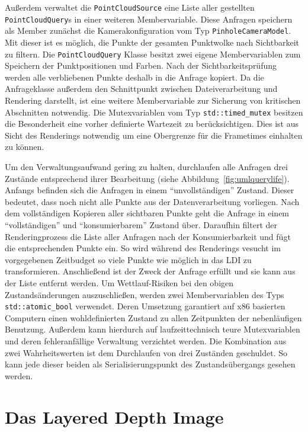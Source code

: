 \documentclass[hyperref, beleg, german]{cgvpub}
\begin{document}
Außerdem verwaltet die \texttt{PointCloudSource} eine Liste aller gestellten
\texttt{PointCloudQuery}s in einer weiteren Membervariable. Diese Anfragen
speichern als Member zunächst die Kamerakonfiguration vom Typ
\texttt{PinholeCameraModel}. Mit dieser ist es möglich, die Punkte der gesamten
Punktwolke nach Sichtbarkeit zu filtern. Die \texttt{PointCloudQuery} Klasse
besitzt zwei eigene Membervariablen zum Speichern der Punktpositionen und
Farben. Nach der Sichtbarkeitsprüfung werden alle verbliebenen Punkte deshalb
in die Anfrage kopiert. Da die Anfrageklasse außerdem den Schnittpunkt zwischen
Dateiverarbeitung und Rendering darstellt, ist eine weitere Membervariable zur
Sicherung von kritischen Abschnitten notwendig. Die Mutexvariablen vom Typ
\texttt{std::timed\_mutex} besitzen die Besonderheit eine vorher definierte
Wartezeit zu berücksichtigen. Dies ist aus Sicht des Renderings notwendig um
eine Obergrenze für die Frametimes einhalten zu können.

Um den Verwaltungsaufwand gering zu halten, durchlaufen alle Anfragen drei
Zustände entsprechend ihrer Bearbeitung (siehe
Abbildung~\ref{fig:umlquerylife}). Anfangs befinden sich die Anfragen in einem
``unvollständigen'' Zustand. Dieser bedeutet, dass noch nicht alle Punkte aus
der Datenverarbeitung vorliegen. Nach dem vollständigen Kopieren aller
sichtbaren Punkte geht die Anfrage in einem ``vollständigen'' und
``konsumierbarem'' Zustand über. Daraufhin filtert der Renderingprozess die
Liste aller Anfragen nach der Konsumierbarkeit und fügt die entsprechenden
Punkte ein. So wird während des Renderings vesucht im vorgegebenen Zeitbudget
so viele Punkte wie möglich in das LDI zu transformieren. Anschließend ist der
Zweck der Anfrage erfüllt und sie kann aus der Liste entfernt werden. Um
Wettlauf-Risiken bei den obigen Zustandsänderungen auszuschließen, werden zwei
Membervariablen des Typs \texttt{std::atomic\_bool} verwendet. Deren Umsetzung
garantiert auf x86 basierten Computern einen wohldefinierten Zustand zu allen
Zeitpunkten der nebenläufigen Benutzung. Außerdem kann hierdurch auf
laufzeittechnisch teure Mutexvariablen und deren fehleranfällige Verwaltung
verzichtet werden. Die Kombination aus zwei Wahrheitswerten ist dem Durchlaufen
von drei Zuständen geschuldet. So kann jede dieser beiden als
Serialisierungspunkt des Zustandsübergangs gesehen werden.

\section{Das Layered Depth Image}
\end{document}
